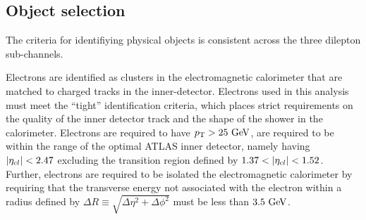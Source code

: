 \subsection{Object selection}
\label{s:object}

The criteria for identifiying physical objects is consistent across the three dilepton sub-channels.

Electrons are identified as clusters in the electromagnetic calorimeter
that are matched to charged tracks in the inner-detector.
Electrons used in this analysis must meet the ``tight'' identification criteria,
which places strict requirements on the quality of the inner detector track and the
shape of the shower in the calorimeter.
Electrons are required to have $\pt>25\GeV$, are required to be within the range of the
optimal ATLAS inner detector, namely having $|\eta_{\text cl}|<2.47$ excluding the
transition region defined by $1.37<|\eta_{\text cl}|<1.52$.
Further, electrons are required to be isolated the electromagnetic calorimeter
by requiring that the transverse energy not associated with the electron within 
a radius defined by $\Delta R\equiv\sqrt{\Delta\eta^2 + \Delta\phi^2}$ must be less than $3.5\GeV$.





